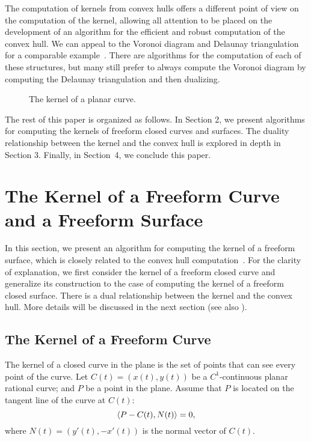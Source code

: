 \documentclass{acmsiggraph}
\begin{document}
The computation of kernels from convex hulls offers a different point of
view on the computation of the kernel, allowing all attention
to be placed on the development of an algorithm
for the efficient and robust computation of the convex hull.
We can appeal to the Voronoi diagram and Delaunay triangulation
for a comparable example~\cite{Prep85}.  There are algorithms for the computation of
each of these structures, but many still prefer to always compute
the Voronoi diagram by computing the Delaunay triangulation and then dualizing.

\begin{figure}
    \begin{center}
    \end{center}
\vskip -0.37in
    \caption{The kernel of a planar curve.}
    \label{fig-kernel-crv}
\end{figure}

The rest of this paper is organized as follows.
In Section 2, we present algorithms for computing the kernels
of freeform closed curves and surfaces.
The duality relationship between the kernel and the convex hull
is explored in depth in Section 3.
Finally, in Section~4, we conclude this paper.


\section{The Kernel of a Freeform Curve and a Freeform Surface}
\label{sec-kernel}

In this section, we present an algorithm for computing the kernel of
a freeform surface, which is closely related to the convex hull 
computation~\cite{Elber2001b,seong2004}.
For the clarity of explanation, we first consider the kernel of
a freeform closed curve and generalize its construction to the case of
computing the kernel of a freeform closed surface.
There is a dual relationship between the kernel and the convex hull.
More details will be discussed in the next section
(see also \cite{jj03}).

\subsection{The Kernel of a Freeform Curve}
\label{subsec-kernel-curve}

The kernel of a closed curve in the plane is the set of points
that can see every point of the curve.
Let $C(t) = (x(t),y(t))$ be a $C^1$-continuous planar rational curve;
and $P$ be a point in the plane.
Assume that $P$ is located on the tangent line of the curve at $C(t)$:
\[
\left<{P-C(t)}, {N(t)} \right> = 0,
\]
where $N(t) = (y'(t),-x'(t))$ is the normal vector of $C(t)$.
\end{document}
